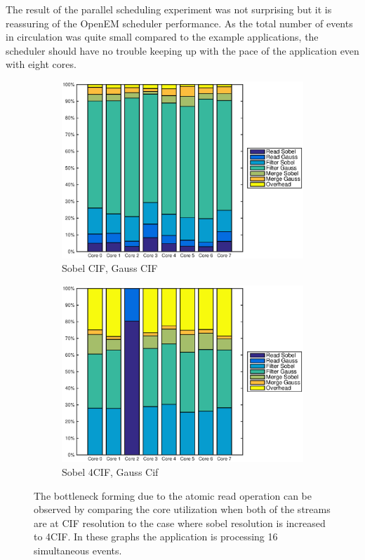 The result of the parallel scheduling experiment was not surprising but it is reassuring of the OpenEM scheduler performance. As the total number of events in circulation was quite small compared to the example applications, the scheduler should have no trouble keeping up with the pace of the application even with eight cores.

\begin{figure}
    \centering
    \begin{subfigure}[t]{0.49\textwidth}
        \centering
        \includegraphics[width=0.99\linewidth]{images/openem_cifcif_8cores_eo.eps}
        \caption{Sobel CIF, Gauss CIF}
        \label{fig:oem8coreeo}
    \end{subfigure}
    \begin{subfigure}[t]{0.49\textwidth}
        \centering
        \includegraphics[width=0.99\linewidth]{images/openem_sobel4cif_gausscif_eo.eps}
        \caption{Sobel 4CIF, Gauss Cif}
        \label{fig:oem8coreeosobel4cif}
    \end{subfigure}
    \caption{The bottleneck forming due to the atomic read operation can be observed by comparing the core utilization when both of the streams are at CIF resolution to the case where sobel resolution is increased to 4CIF. In these graphs the application is processing 16 simultaneous events.}
\end{figure}

